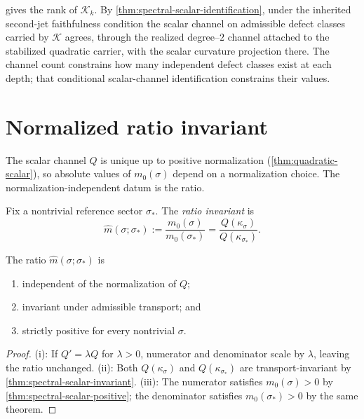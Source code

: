 \begin{remark}
\label{rem:spectral-dimension-not-value}
 gives the rank of $\mathcal K_k$.
By \cref{thm:spectral-scalar-identification}, under the inherited
second-jet faithfulness condition the scalar channel on admissible
defect classes carried by \(\mathcal K\) agrees, through the
realized degree--\(2\) channel attached to the stabilized quadratic
carrier, with the scalar curvature projection there.
The channel count constrains how many independent defect classes exist at
each depth; that conditional scalar-channel identification
constrains their values.
\end{remark}

\section{Normalized ratio invariant}
\label{sec:spectral-ratio}

The scalar channel $Q$ is unique up to positive normalization
(\cref{thm:quadratic-scalar}), so absolute values of $m_0(\sigma)$
depend on a normalization choice.
The normalization-independent datum is the ratio.

\begin{definition}
\label{def:spectral-ratio}
Fix a nontrivial reference sector $\sigma_*$.
The \emph{ratio invariant} is
\[
  \widehat{m}(\sigma;\sigma_*)
  := \frac{m_0(\sigma)}{m_0(\sigma_*)}
  = \frac{Q(\kappa_\sigma)}{Q(\kappa_{\sigma_*})}.
\]
\end{definition}

\begin{theorem}
\label{thm:spectral-ratio-properties}
The ratio $\widehat{m}(\sigma;\sigma_*)$ is
\begin{enumerate}[label=\textup{(\roman*)}]
\item independent of the normalization of $Q$;
\item invariant under admissible transport; and
\item strictly positive for every nontrivial $\sigma$.
\end{enumerate}
\end{theorem}

\begin{proof}
\textup{(i)}: If $Q' = \lambda Q$ for $\lambda > 0$, numerator and
denominator scale by $\lambda$, leaving the ratio unchanged.
\textup{(ii)}: Both $Q(\kappa_\sigma)$ and $Q(\kappa_{\sigma_*})$ are
transport-invariant by \cref{thm:spectral-scalar-invariant}.
\textup{(iii)}: The numerator satisfies $m_0(\sigma) > 0$ by
\cref{thm:spectral-scalar-positive}; the denominator satisfies
$m_0(\sigma_*) > 0$ by the same theorem.
\end{proof}

